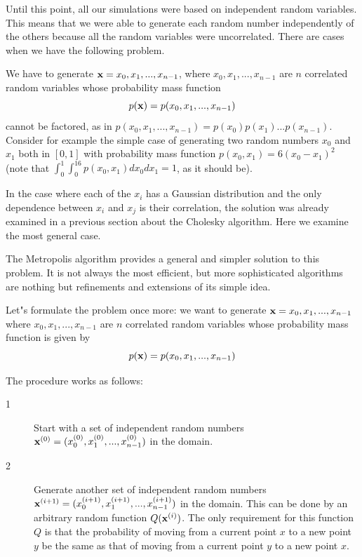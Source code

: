 \documentclass[justified, sixbynine]{tufte-book}
\theoremstyle{plain}%
\newtheorem * {corollary}{Corollary}
\theoremstyle{definition}
\theoremstyle{remark}
\newtheorem * {remark}{Remark}
\newtheorem * {note}{Note}
\begin{document}
\begin{fullwidth}
Until this point, all our simulations were based on independent random
variables. This means that we were able to generate each random number
independently of the others because all the random variables were
uncorrelated. There are cases when we have the following problem.

We have to generate ${\bf x}=x_0, x_1, ..., x_{n-1}$, where $x_0, x_1, ..., x_{n-1}$
are $n$ correlated random variables whose probability mass function
\begin{equation}
p({\bf x})=p(x_0, x_1, ..., x_{n-1})
\end{equation}
cannot be factored, as in $p(x_0, x_1, ..., x_{n-1})=p(x_0)p(x_1)...p(x_{n-1})$. Consider for example the simple case of generating two random numbers $x_0$
and $x_1$ both in $[0, 1]$ with probability mass function $%
p(x_0, x_1)=6(x_0-x_1)^2$ (note that $\int_0^1\int_0^16p(x_0, x_1)dx_0dx_1=1$, 
as it should be).

In the case where each of the $x_i$ has a Gaussian distribution and the only dependence between $x_i$ and $x_j$ is their correlation, the solution was already examined in a previous section about the Cholesky algorithm. Here we examine the most general case.

The Metropolis algorithm provides a general and simpler solution to this problem. It is not always the most efficient, but more sophisticated algorithms are nothing but refinements and extensions of its simple idea.

Let"s formulate the problem once more: we want to generate ${\bf x}%
=x_0, x_1, ..., x_{n-1}$ where $x_0, x_1, ..., x_{n-1}$ are $n$ correlated random
variables whose probability mass function is given by
\begin{equation}
p({\bf x})=p(x_0, x_1, ..., x_{n-1})
\end{equation}

The procedure works as follows:

\begin{description}
\item[1]  Start with a set of independent random numbers ${\bf x}%
^{(0)}=(x_0^{(0)}, x_1^{(0)}, ..., x_{n-1}^{(0)})$ in the domain.

\item[2]  Generate another set of independent random numbers ${\bf x}%
^{(i+1)}=(x_0^{(i+1)}, x_1^{(i+1)}, ..., x_{n-1}^{(i+1)})$ in the domain. This can be done by an arbitrary random function $Q({\bf x}^{(i)})$. The only requirement for this function $Q$ is that the probability of moving from a current point $x$ to a new point $y$ be the same as that of moving from a current point $y$ to a new point $x$.


\end{description}
\end{fullwidth}
\end{document}
